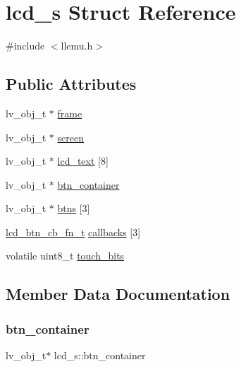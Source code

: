 \hypertarget{structlcd__s}{}\section{lcd\+\_\+s Struct Reference}
\label{structlcd__s}


{\ttfamily \#include $<$llemu.\+h$>$}

\subsection*{Public Attributes}
\begin{DoxyCompactItemize}
\item 
lv\+\_\+obj\+\_\+t $\ast$ \hyperlink{structlcd__s_a5067b029a06de4122b9629596a96ab2a}{frame}
\item 
lv\+\_\+obj\+\_\+t $\ast$ \hyperlink{structlcd__s_ae9982890a610a39d2a2c6986652d96fc}{screen}
\item 
lv\+\_\+obj\+\_\+t $\ast$ \hyperlink{structlcd__s_a79e5229a56be1854fa2f61cb6089f1c3}{lcd\+\_\+text} \mbox{[}8\mbox{]}
\item 
lv\+\_\+obj\+\_\+t $\ast$ \hyperlink{structlcd__s_a5b02408bab493ec0b9feca4042028fe1}{btn\+\_\+container}
\item 
lv\+\_\+obj\+\_\+t $\ast$ \hyperlink{structlcd__s_a66110a1c094e205651c998dfa28a57ff}{btns} \mbox{[}3\mbox{]}
\item 
\hyperlink{llemu_8h_a0f5bb2a3264a6ad95973f9c8e6b3198e}{lcd\+\_\+btn\+\_\+cb\+\_\+fn\+\_\+t} \hyperlink{structlcd__s_a94cf01cb0d74b92bdd798b95861ed2cd}{callbacks} \mbox{[}3\mbox{]}
\item 
volatile uint8\+\_\+t \hyperlink{structlcd__s_a6aaa4bc625cc13f48b47acd64bcfa757}{touch\+\_\+bits}
\end{DoxyCompactItemize}


\subsection{Member Data Documentation}
\mbox{\label{structlcd__s_a5b02408bab493ec0b9feca4042028fe1}} 
\subsubsection{\texorpdfstring{btn\+\_\+container}{btn\_container}}
{\footnotesize\ttfamily lv\+\_\+obj\+\_\+t$\ast$ lcd\+\_\+s\+::btn\+\_\+container}


